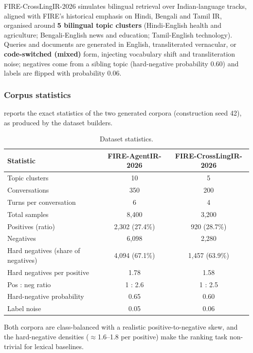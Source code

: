 FIRE-CrossLingIR-2026 simulates bilingual retrieval over Indian-language tracks, aligned with FIRE's historical emphasis on Hindi, Bengali and Tamil IR, organised around \textbf{5 bilingual topic clusters} (Hindi-English health and agriculture; Bengali-English news and education; Tamil-English technology). Queries and documents are generated in English, transliterated vernacular, or \textbf{code-switched (mixed)} form, injecting vocabulary shift and transliteration noise; negatives come from a sibling topic (hard-negative probability 0.60) and labels are flipped with probability 0.06.

\subsubsection{Corpus statistics}

 reports the exact statistics of the two generated corpora (construction seed 42), as produced by the dataset builders.

\begin{table}[tb]
\setlength{\tabcolsep}{3pt}
\footnotesize
\caption{Dataset statistics.}
\label{tab:datasets}
\centering
\begin{tabular}{lcc}
\toprule
Statistic & FIRE-AgentIR-2026 & FIRE-CrossLingIR-2026 \\
\midrule
Topic clusters & 10 & 5 \\
Conversations & 350 & 200 \\
Turns per conversation & 6 & 4 \\
Total samples & 8,400 & 3,200 \\
Positives (ratio) & 2,302 (27.4\%) & 920 (28.7\%) \\
Negatives & 6,098 & 2,280 \\
Hard negatives (share of negatives) & 4,094 (67.1\%) & 1,457 (63.9\%) \\
Hard negatives per positive & 1.78 & 1.58 \\
Pos : neg ratio & 1 : 2.6 & 1 : 2.5 \\
Hard-negative probability & 0.65 & 0.60 \\
Label noise & 0.05 & 0.06 \\
\bottomrule
\end{tabular}
\end{table}

Both corpora are class-balanced with a realistic positive-to-negative skew, and the hard-negative densities ($\approx$1.6--1.8 per positive) make the ranking task non-trivial for lexical baselines.

